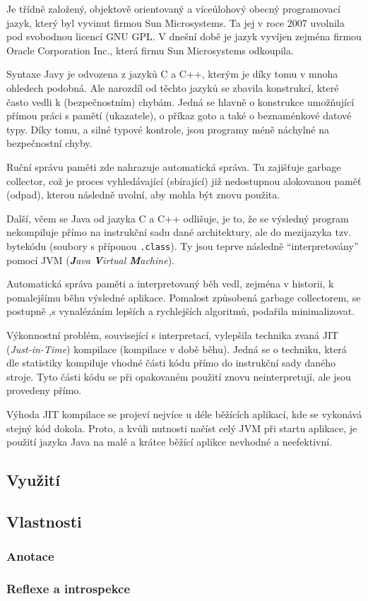 Je třídně založený, objektově orientovaný a víceúlohový obecný programovací jazyk, který byl vyvinut firmou Sun Microsystems. Ta jej v roce 2007 uvolnila pod svobodnou licencí GNU GPL. V dnešní době je jazyk vyvíjen zejména firmou Oracle Corporation Inc., která firmu Sun Microsystems odkoupila.

Syntaxe Javy je odvozena z jazyků C a C++, kterým je díky tomu v mnoha ohledech podobná. Ale narozdíl od těchto jazyků se zbavila konstrukcí, které často vedli k (bezpečnostním) chybám. Jedná se hlavně o konstrukce umožňující přímou práci s pamětí (ukazatele), o příkaz goto a také o beznaménkové datové typy. Díky tomu, a silné typové kontrole, jsou programy méně náchylné na bezpečnostní chyby.

Ruční správu paměti zde nahrazuje automatická správa. Tu zajišťuje garbage collector, což je proces vyhledávající (sbírající) již nedostupnou alokovanou paměť (odpad), kterou následně uvolní, aby mohla být znovu použita.

Další, včem se Java od jazyka C a C++ odlišuje, je to, že se výsledný program nekompiluje přímo na instrukční sadu dané architektury, ale do mezijazyka tzv. bytekódu (soubory s příponou \texttt{.class}). Ty jsou teprve následně "`interpretovány"' pomocí JVM (\emph{\textbf{J}ava \textbf{V}irtual \textbf{M}achine}).

Automatická správa paměti a interpretovaný běh vedl, zejména v historii, k pomalejšímu běhu výsledné aplikace. Pomalost způsobená garbage collectorem, se postupně ,s vynalézáním lepších a rychlejších algoritmů, podařila minimalizovat.

Výkonnostní problém, související s interpretací, vylepšila technika zvaná JIT (\emph{Just-in-Time}) kompilace (kompilace v době běhu). Jedná se o techniku, která dle statistiky kompiluje vhodné části kódu přímo do instrukční sady daného stroje. Tyto části kódu se při opakovaném použití znovu neinterpretují, ale jsou provedeny přímo.

Výhoda JIT kompilace se projeví nejvíce u déle běžících aplikací, kde se vykonává stejný kód dokola. Proto, a kvůli nutnosti načíst celý JVM při startu aplikace, je použití jazyka Java na malé a krátce běžící aplikce nevhodné a neefektivní.
\subsection{Využití}
\subsection{Vlastnosti}
\subsubsection{Anotace}
\subsubsection{Reflexe a introspekce}
 
